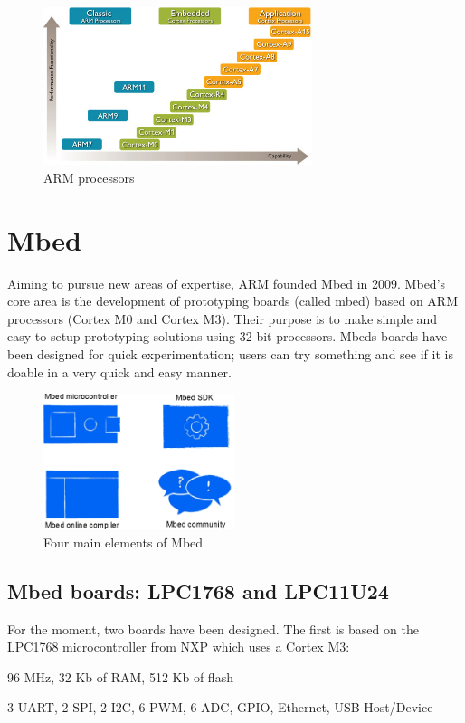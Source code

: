 \documentclass[pdftex,10pt,a4paper]{report}
\newenvironment{packed_item}{
\begin{itemize}
  \setlength{\itemsep}{1pt}
  \setlength{\parskip}{0pt}
  \setlength{\parsep}{0pt}
}{\end{itemize}}
\begin{document}
\begin{figure}[h!]
\centering
\includegraphics[width=0.7\textwidth]{./arm_proc.jpg}
\caption{ARM processors}
\label{ARM processors}
\end{figure}

\newpage

\section{Mbed}
Aiming to pursue new areas of expertise, ARM founded Mbed in 2009. Mbed's core area is the development of prototyping boards (called mbed) based on ARM processors (Cortex M0 and Cortex M3). Their purpose is to make simple and easy to setup prototyping solutions using 32-bit processors. Mbeds boards have been designed for quick experimentation; users can try something and see if it is doable in a very quick and easy manner.

\begin{figure}[h!]
\centering
\includegraphics[width=0.5\textwidth]{./mbed_4elements.jpg}
\caption{Four main elements of Mbed}
\label{Four main elements of Mbed}
\end{figure}

\subsection{Mbed boards: LPC1768 and LPC11U24}
For the moment, two boards have been designed. The first is based on the LPC1768 microcontroller from NXP which uses a Cortex M3:
\begin{packed_item}
	\item 96 MHz, 32 Kb of RAM, 512 Kb of flash
	\item 3 UART, 2 SPI, 2 I2C, 6 PWM, 6 ADC, GPIO, Ethernet, USB Host/Device
\end{packed_item}
\end{document}
